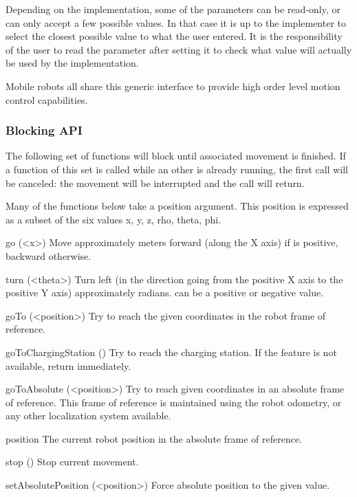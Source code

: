 Depending on the implementation, some of the parameters can be read-only, or
can only accept a few possible values. In that case it is up to the implementer
to select the closest possible value to what the user entered. It is the
responsibility of the user to read the parameter after setting it to check
what value will actually be used by the implementation.



Mobile robots all share this generic interface to provide high order
level motion control capabilities.

\subsubsection{Blocking API}

The following set of functions will block until associated movement is finished.
If a function of this set is called while an other is already running, the
first call will be canceled: the movement will be interrupted and the
call will return.

Many of the functions below take a position argument. This position is expressed
as a subset of the six values x, y, z, rho, theta, phi.

\begin{urbiscriptapi}
\item[go](<x>) Move approximately  meters forward (along the X axis)
  if  is positive, backward otherwise.

\item[turn](<theta>) Turn left (in the direction going from the positive X
  axis to the positive Y axis) approximately  radians.
   can be a positive or negative value.

\item[goTo](<position>) Try to reach the given coordinates in the robot
  frame of reference.

\item[goToChargingStation]() Try to reach the charging station. If the
  feature is not available, return immediately.

\item[goToAbsolute](<position>) Try to reach given coordinates in an
  absolute frame of reference. This frame of reference is maintained using
  the robot odometry, or any other localization system available.

\item[position] The current robot position in the absolute frame of
  reference.

\item[stop]() Stop current movement.

\item[setAbsolutePosition](<position>) Force absolute position to the given
  value.
\end{urbiscriptapi}

